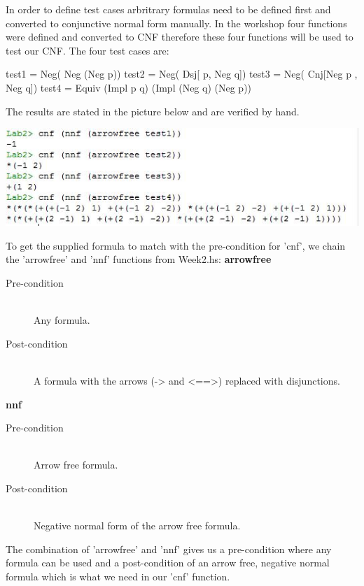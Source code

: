 \documentclass{article}
\begin{document}
In order to define test cases arbritrary formulas need to be defined first and converted to conjunctive normal form manually. In the workshop four functions were defined and converted to CNF therefore these four functions will be used to test our CNF. 
The four test cases are:

\begin{code}
test1 = Neg( Neg (Neg p))
test2 = Neg( Dsj[ p, Neg q])
test3 = Neg( Cnj[Neg p , Neg q])
test4 = Equiv (Impl p q) (Impl (Neg q) (Neg p))
\end{code}

The results are stated in the picture below and are verified by hand.

\includegraphics{Knipsel2}

To get the supplied formula to match with the pre-condition for 'cnf', we chain the 'arrowfree' and 'nnf' functions from Week2.hs:
\textbf{arrowfree}
\begin{description}
  \item[Pre-condition] \hfill \\
  Any formula.
  \item[Post-condition] \hfill \\
  A formula with the arrows (-> and <==>) replaced with disjunctions.
\end{description}

\textbf{nnf}
\begin{description}
  \item[Pre-condition] \hfill \\
  Arrow free formula.
  \item[Post-condition] \hfill \\
  Negative normal form of the arrow free formula.
\end{description}
The combination of 'arrowfree' and 'nnf' gives us a pre-condition where any formula can be used and a post-condition of an arrow free, negative normal formula which is what we need in our 'cnf' function.
\end{document}
